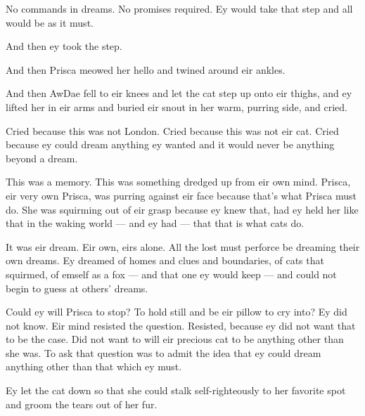 No commands in dreams. No promises required. Ey would take that step and all would be as it must.

And then ey took the step.

And then Prisca meowed her hello and twined around eir ankles.

And then AwDae fell to eir knees and let the cat step up onto eir thighs, and ey lifted her in eir arms and buried eir snout in her warm, purring side, and cried.

Cried because this was not London. Cried because this was not eir cat. Cried because ey could dream anything ey wanted and it would never be anything beyond a dream.

This was a memory. This was something dredged up from eir own mind. Prisca, eir very own Prisca, was purring against eir face because that's what Prisca must do. She was squirming out of eir grasp because ey knew that, had ey held her like that in the waking world — and ey had — that that is what cats do.

It was eir dream. Eir own, eirs alone. All the lost must perforce be dreaming their own dreams. Ey dreamed of homes and clues and boundaries, of cats that squirmed, of emself as a fox — and that one ey would keep — and could not begin to guess at others' dreams.

Could ey will Prisca to stop? To hold still and be eir pillow to cry into? Ey did not know. Eir mind resisted the question. Resisted, because ey did not want that to be the case. Did not want to will eir precious cat to be anything other than she was. To ask that question was to admit the idea that ey could dream anything other than that which ey must.

Ey let the cat down so that she could stalk self-righteously to her favorite spot and groom the tears out of her fur.
